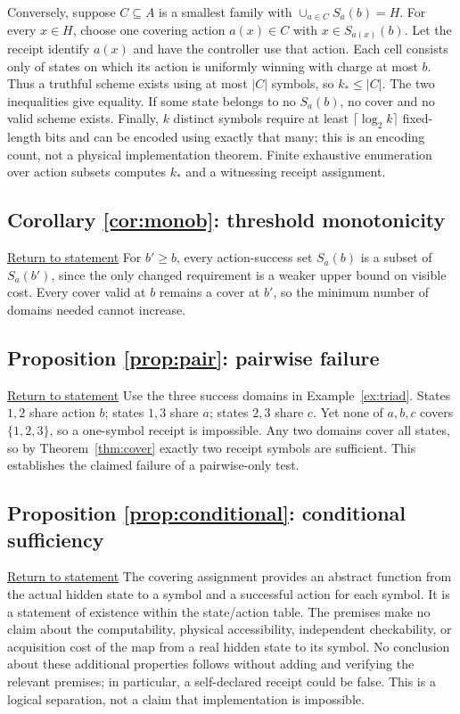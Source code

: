 \documentclass[11pt,letterpaper]{article}
\theoremstyle{definition}
\theoremstyle{remark}
\newcommand{\backstatement}[1]{\hyperlink{stmt:#1}{\footnotesize Return to statement}}
\begin{document}
Conversely, suppose $C\subseteq A$ is a smallest family with $\cup_{a\in C}S_a(b)=H$. For every $x\in H$, choose one covering action $a(x)\in C$ with $x\in S_{a(x)}(b)$. Let the receipt identify $a(x)$ and have the controller use that action. Each cell consists only of states on which its action is uniformly winning with charge at most $b$. Thus a truthful scheme exists using at most $|C|$ symbols, so $k_*\le |C|$. The two inequalities give equality. If some state belongs to no $S_a(b)$, no cover and no valid scheme exists. Finally, $k$ distinct symbols require at least $\lceil\log_2 k\rceil$ fixed-length bits and can be encoded using exactly that many; this is an encoding count, not a physical implementation theorem. Finite exhaustive enumeration over action subsets computes $k_*$ and a witnessing receipt assignment.

\hypertarget{proof:monob}{}\subsection*{Corollary \ref{cor:monob}: threshold monotonicity} \backstatement{monob}
For $b'\ge b$, every action-success set $S_a(b)$ is a subset of $S_a(b')$, since the only changed requirement is a weaker upper bound on visible cost. Every cover valid at $b$ remains a cover at $b'$, so the minimum number of domains needed cannot increase.

\hypertarget{proof:pair}{}\subsection*{Proposition \ref{prop:pair}: pairwise failure} \backstatement{pair}
Use the three success domains in Example~\ref{ex:triad}. States $1,2$ share action $b$; states $1,3$ share $a$; states $2,3$ share $c$. Yet none of $a,b,c$ covers $\{1,2,3\}$, so a one-symbol receipt is impossible. Any two domains cover all states, so by Theorem~\ref{thm:cover} exactly two receipt symbols are sufficient. This establishes the claimed failure of a pairwise-only test.

\hypertarget{proof:conditional}{}\subsection*{Proposition \ref{prop:conditional}: conditional sufficiency} \backstatement{conditional}
The covering assignment provides an abstract function from the actual hidden state to a symbol and a successful action for each symbol. It is a statement of existence within the state/action table. The premises make no claim about the computability, physical accessibility, independent checkability, or acquisition cost of the map from a real hidden state to its symbol. No conclusion about these additional properties follows without adding and verifying the relevant premises; in particular, a self-declared receipt could be false. This is a logical separation, not a claim that implementation is impossible.
\end{document}
